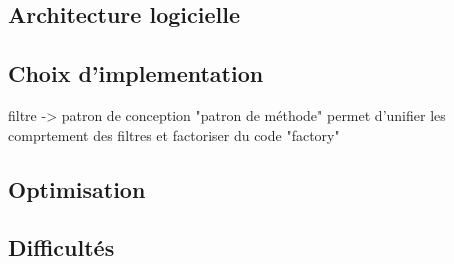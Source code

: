 \subsection{Architecture logicielle}

\subsection{Choix d'implementation} %


filtre ->  patron de conception "patron de méthode" permet d'unifier les comprtement des filtres et factoriser du code
			"factory"

\subsection{Optimisation}

\subsection{Difficultés}